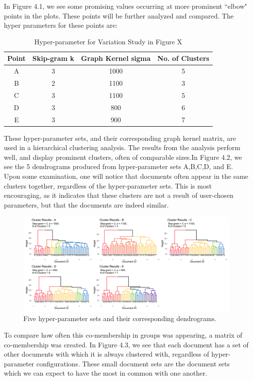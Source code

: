 In Figure 4.1, we see some promising values occurring at more prominent ``elbow" points in the plots. These points will be further analyzed and compared. The hyper parameters for these points are:\\

\begin{table}
\centering
\begin{tabular}{c|c|c|c}
Point&Skip-gram k& Graph Kernel sigma&No. of Clusters \\
\hline
A&3&1000&5\\
B&2&1100&3\\
C&3&1100&5\\
D&3&800&6\\
E&3&900&7
\end{tabular}
\caption{Hyper-parameter for Variation Study in Figure X}
\end{table}

These hyper-parameter sets, and their corresponding graph kernel matrix, are used in a hierarchical clustering analysis. The results from the analysis perform well, and display prominent clusters, often of comparable sizes.In Figure 4.2, we see the 5 dendrograms produced from hyper-parameter sets A,B,C,D, and E. Upon some examination, one will notice that documents often appear in the same clusters together, regardless of the hyper-parameter sets. This is most encouraging, as it indicates that these clusters are not a result of user-chosen parameters, but that the documents are indeed similar. \\

\begin{figure}
\includegraphics[width=6in]{Content/Images/5cluster.png}
\caption{Five hyper-parameter sets and their corresponding dendrograms.}
\end{figure}

To compare how often this co-membership in groups was appearing, a matrix of co-membership was created. In Figure 4.3, we see that each document has a set of other documents with which it is always clustered with, regardless of hyper-parameter configurations. These small document sets are the document sets which we can expect to have the most in common with one another.\\


